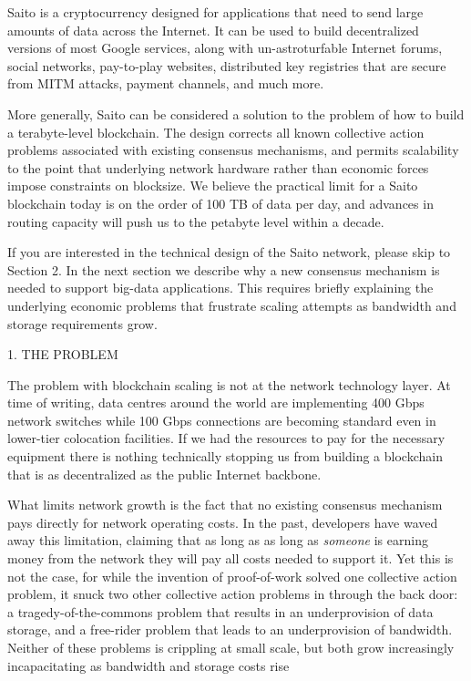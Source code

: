 \documentclass[11.5pt, oneside]{article}   	%
\begin{document}
\begin{multicols}{2}
Saito is a cryptocurrency designed for applications that need to send large amounts of data across the Internet. It can be used to build decentralized versions of most Google services, along with un-astroturfable Internet forums, social networks, pay-to-play websites, distributed key registries that are secure from MITM attacks, payment channels, and much more.

More generally, Saito can be considered a solution to the problem of how to build a terabyte-level blockchain. The design corrects all known collective action problems associated with existing consensus mechanisms, and permits scalability to the point that underlying network hardware rather than economic forces impose constraints on blocksize. We believe the practical limit for a Saito blockchain today is on the order of 100 TB of data per day, and advances in routing capacity will push us to the petabyte level within a decade.

If you are interested in the technical design of the Saito network, please skip to Section 2. In the next section we describe why a new consensus mechanism is needed to support big-data applications. This requires briefly explaining the underlying economic problems that frustrate scaling attempts as bandwidth and storage requirements grow.


1. THE PROBLEM

The problem with blockchain scaling is not at the network technology layer. At time of writing, data centres around the world are implementing 400 Gbps network switches while 100 Gbps connections are becoming standard even in lower-tier colocation facilities. If we had the resources to pay for the necessary equipment there is nothing technically stopping us from building a blockchain that is as decentralized as the public Internet backbone.

What limits network growth is the fact that no existing consensus mechanism pays directly for network operating costs. In the past, developers have waved away this limitation, claiming that as long as as long as {\textit{someone}} is earning money from the network they will pay all costs needed to support it. Yet this is not the case, for while the invention of proof-of-work solved one collective action problem, it snuck two other collective action problems in through the back door: a tragedy-of-the-commons problem that results in an underprovision of data storage, and a free-rider problem that leads to an underprovision of bandwidth. Neither of these problems is crippling at small scale, but both grow increasingly incapacitating as bandwidth and storage costs rise


\end{multicols}
\end{document}
